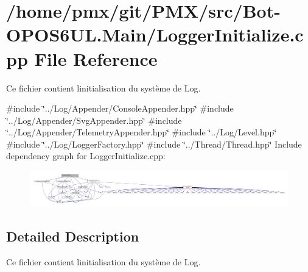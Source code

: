 \hypertarget{src_2Bot-OPOS6UL_8Main_2LoggerInitialize_8cpp}{}\section{/home/pmx/git/\+P\+M\+X/src/\+Bot-\/\+O\+P\+O\+S6\+UL.Main/\+Logger\+Initialize.cpp File Reference}
\label{src_2Bot-OPOS6UL_8Main_2LoggerInitialize_8cpp}


Ce fichier contient l\textquotesingle{}initialisation du système de Log.  


{\ttfamily \#include \char`\"{}../\+Log/\+Appender/\+Console\+Appender.\+hpp\char`\"{}}\newline
{\ttfamily \#include \char`\"{}../\+Log/\+Appender/\+Svg\+Appender.\+hpp\char`\"{}}\newline
{\ttfamily \#include \char`\"{}../\+Log/\+Appender/\+Telemetry\+Appender.\+hpp\char`\"{}}\newline
{\ttfamily \#include \char`\"{}../\+Log/\+Level.\+hpp\char`\"{}}\newline
{\ttfamily \#include \char`\"{}../\+Log/\+Logger\+Factory.\+hpp\char`\"{}}\newline
{\ttfamily \#include \char`\"{}../\+Thread/\+Thread.\+hpp\char`\"{}}\newline
Include dependency graph for Logger\+Initialize.\+cpp\+:
\nopagebreak
\begin{figure}[H]
\begin{center}
\leavevmode
\includegraphics[width=350pt]{src_2Bot-OPOS6UL_8Main_2LoggerInitialize_8cpp__incl}
\end{center}
\end{figure}


\subsection{Detailed Description}
Ce fichier contient l\textquotesingle{}initialisation du système de Log. 

